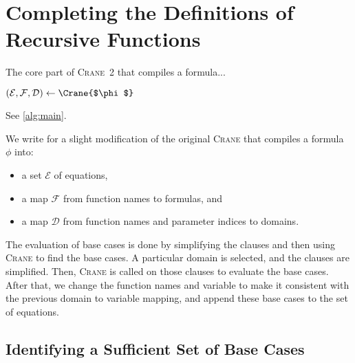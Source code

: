 \documentclass{article}
\theoremstyle{definition}
\newcommand{\Cranetwo}{\textsc{Crane}~2}
\begin{document}
\section{Completing the Definitions of Recursive Functions}\label{sec:main}

\begin{algorithm}[t]
  \caption{The core part of \Cranetwo{} that compiles a formula...}\label{alg:main}%
  $(\mathcal{E}, \mathcal{F}, \mathcal{D}) \gets \Crane{$\phi$}$\;
\end{algorithm}

See \cref{alg:main}.

We write \Crane for a slight modification of the original \textsc{Crane} that
compiles a formula $\phi$ into:
\begin{itemize}
  \item a set $\mathcal{E}$ of equations,
  \item a map $\mathcal{F}$ from function names to formulas, and
  \item a map $\mathcal{D}$ from function names and parameter indices to
        domains.
\end{itemize}

The evaluation of base cases is done by simplifying the clauses and then using
\textsc{Crane} to find the base cases. A particular domain is selected, and the
clauses are simplified. Then, \textsc{Crane} is called on those clauses to
evaluate the base cases. After that, we change the function names and variable
to make it consistent with the previous domain to variable mapping, and append
these base cases to the set of equations.


\subsection{Identifying a Sufficient Set of Base Cases}\label{sec:identifying}
\end{document}
